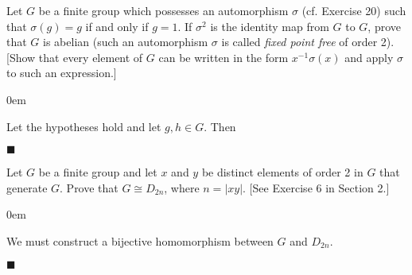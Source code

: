 \documentclass[12pt]{article}
\renewcommand{\qed}{\hfill$\blacksquare$}
\renewenvironment{proof}{\begin{addmargin}[1em]{0em}\begin{newproof}}{\end{newproof}\end{addmargin}\qed}
\newenvironment{problem}[2][Exercise]{\begin{trivlist}
\item[\hskip \labelsep {\bfseries #1}\hskip \labelsep {\bfseries #2.}]}{\end{trivlist}}
\begin{document}
\begin{problem}{1.6.23}
Let $G$ be a finite group which possesses an automorphism $\sigma$ (cf. Exercise 20) such that $\sigma\left(g\right)=g$ if and only if $g=1$. If $\sigma^2$ is the identity map from $G$ to $G$, prove that $G$ is abelian (such an automorphism $\sigma$ is called \textit{fixed point free} of order 2). [Show that every element of $G$ can be written in the form $x^{-1}\sigma\left(x\right)$ and apply $\sigma$ to such an expression.]
\end{problem}
\begin{proof}
Let the hypotheses hold and let $g,h\in G$. Then
\end{proof}




\begin{problem}{1.6.24}
Let $G$ be a finite group and let $x$ and $y$ be distinct elements of order 2 in $G$ that generate $G$. Prove that $G\cong D_{2n}$, where $n=\left|xy\right|$. [See Exercise 6 in Section 2.]
\end{problem}
\begin{proof}
We must construct a bijective homomorphism between $G$ and $D_{2n}$.
\end{proof}
\end{document}
